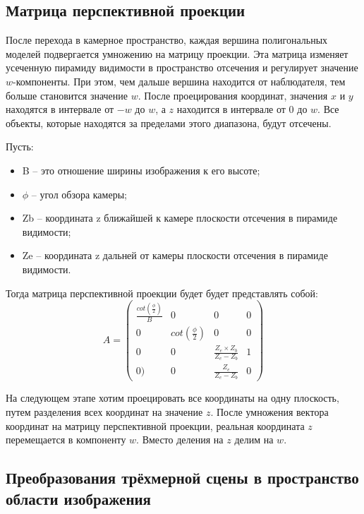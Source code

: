 \subsection{Матрица перспективной проекции}

После перехода в камерное пространство, каждая вершина полигональных моделей подвергается умножению на матрицу проекции. 
Эта матрица изменяет усеченную пирамиду видимости в пространство отсечения и регулирует значение $w$-компоненты. 
При этом, чем дальше вершина находится от наблюдателя, тем больше становится значение $w$. 
После проецирования координат, значения $x$ и $y$ находятся в интервале от $-w$ до $w$, а $z$ находится в интервале от $0$ до $w$. 
Все объекты, которые находятся за пределами этого диапазона, будут отсечены.

Пусть:
\begin{itemize}
	\item B -- это отношение ширины изображения к его высоте;
	\item $\phi$ -- угол обзора камеры;
	\item Zb -- координата z ближайшей к камере плоскости отсечения в пирамиде видимости;
	\item Ze -- координата z дальней от камеры плоскости отсечения в пирамиде видимости.
\end{itemize}

Тогда матрица перспективной проекции будет будет представлять собой:
\begin{equation}
	A = \left(
	\begin{array}{cccc}
		\frac{cot(\frac{\phi}{2})}{B} & 0 & 0 & 0\\
		0 & cot(\frac{\phi}{2}) & 0 & 0 \\
		0 & 0 & \frac{Z_e \times Z_b}{Z_e - Z_b} & 1 \\
		0) & 0 & \frac{Z_e}{Z_e - Z_b} & 0
	\end{array}
	\right)
\end{equation}

На следующем этапе хотим проецировать все координаты на одну плоскость, путем разделения всех координат на значение $z$. 
После умножения вектора координат на матрицу перспективной проекции, реальная координата $z$ перемещается в компоненту $w$. 
Вместо деления на $z$ делим на $w$.

\subsection{Преобразования трёхмерной сцены в пространство области изображения}

